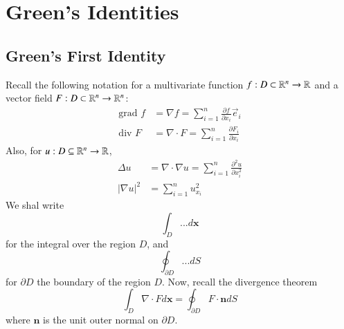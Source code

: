 %
%
%
\chapter{Green's Identities}
\label{Green} %


\section{Green's First Identity}

Recall the following notation for a multivariate function $f:D\subset \mathbb R^n\rightarrow \mathbb R$ and a vector field $F:D\subset\mathbb R^n\rightarrow \mathbb R^n$: \begin{align*}
    \text{grad }f &= \nabla f = \sum_{i=1}^n\frac{\partial f}{\partial x_i}\vec{e}_i \\
    \text{div }F &= \nabla \cdot F = \sum_{i=1}^n\frac{\partial F_i}{\partial x_i}
\end{align*}
Also, for $u:D\subseteq \mathbb R^n\rightarrow \mathbb R$, \begin{align*}
    \Delta u &= \nabla\cdot \nabla u = \sum_{i=1}^n\frac{\partial^2 u}{\partial x_i^2} \\
    |\nabla u|^2 &= \sum_{i=1}^nu_{x_i}^2
\end{align*}
We shal write \begin{equation*}
    \int_D...d\mathbf{x}
\end{equation*}
for the integral over the region $D$, and \begin{equation*}
    \oint_{\partial D}...dS
\end{equation*}
for $\partial D$ the boundary of the region $D$. Now, recall the divergence theorem \begin{equation}
    \boxed{\int_D\nabla \cdot Fd\mathbf{x} = \oint_{\partial D}F\cdot \mathbf{n}dS}
\end{equation}
where $\mathbf{n}$ is the unit outer normal on $\partial D$.

